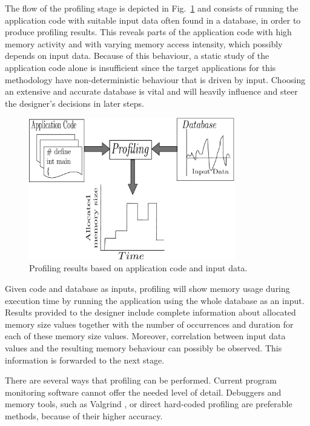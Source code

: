 The flow of the profiling stage is depicted in Fig.~\ref{fig:profilingA} and consists of running the application code with suitable input data often found in a database, in order to produce profiling results. This reveals parts of the application code with high memory activity and with varying memory access intensity, which possibly depends on input data. Because of this behaviour, a static study of the application code alone is insufficient since the target applications for this methodology have non-deterministic behaviour that is driven by input. Choosing an extensive and accurate database is vital and will heavily influence and steer the designer's decisions in later steps.

\begin{figure}[!t]
\centering
\includegraphics[width=0.8\textwidth]{A/profiling_v2-eps-converted-to.pdf}
\caption{Profiling results based on application code and input data.}
\label{fig:profilingA}
\end{figure}

Given code and database as inputs, profiling will show memory usage during execution time by running the application using the whole database as an input. Results provided to the designer include complete information about allocated memory size values together with the number of occurrences and duration for each of these memory size values. Moreover, correlation between input data values and the resulting memory behaviour can possibly be observed. This information is forwarded to the next stage.

There are several ways that profiling can be performed. Current program monitoring software cannot offer the needed level of detail. Debuggers and memory tools, such as Valgrind \cite{Valgrind}, or direct hard-coded profiling are preferable methods, because of their higher accuracy.


